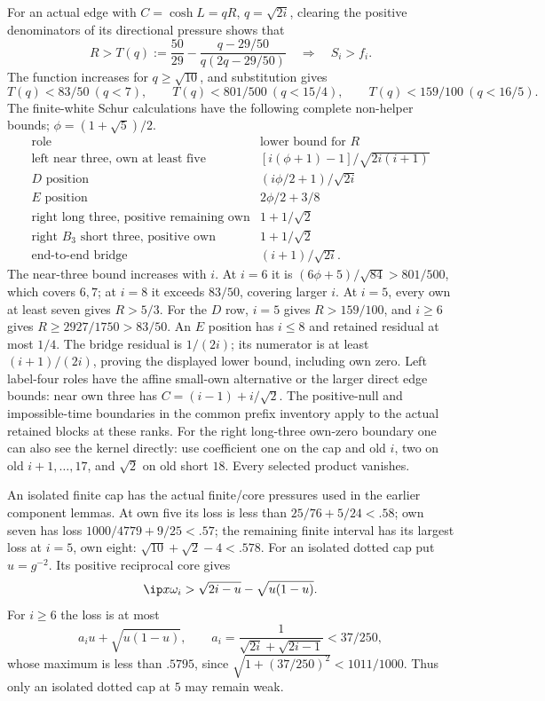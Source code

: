For an actual edge with \(C=\cosh L=qR\), \(q=\sqrt{2i}\),
clearing the positive denominators of its directional pressure
shows that
\[
 R>T(q):=\frac{50}{29}
    -\frac{q-29/50}{q(2q-29/50)}
 \quad\Longrightarrow\quad S_i>f_i.
\]
The function increases for \(q\geq\sqrt{10}\), and substitution gives
\[
 T(q)<83/50\ (q<7),\qquad
 T(q)<801/500\ (q<15/4),\qquad
 T(q)<159/100\ (q<16/5).
\]
The finite-white Schur calculations have the following complete
non-helper bounds; \(\phi=(1+\sqrt5)/2\).
\[
\begin{array}{c|l}
\text{role}&\text{lower bound for }R\\ \hline
\text{left near three, own at least five}
 &[i(\phi+1)-1]/\sqrt{2i(i+1)}\\
D\text{ position}&(i\phi/2+1)/\sqrt{2i}\\
E\text{ position}&2\phi/2+3/8\\
\text{right long three, positive remaining own}
 &1+1/\sqrt2\\
\text{right }B_3\text{ short three, positive own}
 &1+1/\sqrt2\\
\text{end-to-end bridge}&(i+1)/\sqrt{2i}.
\end{array}
\]
The near-three bound increases with \(i\). At \(i=6\) it is
\((6\phi+5)/\sqrt{84}>801/500\), which covers \(6,7\);
at \(i=8\) it exceeds \(83/50\), covering larger \(i\).
At \(i=5\), every own at least seven gives \(R>5/3\).
For the \(D\) row, \(i=5\) gives \(R>159/100\), and
\(i\geq6\) gives \(R\geq2927/1750>83/50\).
An \(E\) position has \(i\leq8\) and retained residual at most
\(1/4\). The bridge residual is \(1/(2i)\); its numerator is
at least \((i+1)/(2i)\), proving the displayed lower bound,
including own zero. Left label-four roles have the affine
small-own alternative or the larger direct edge bounds:
near own three has \(C=(i-1)+i/\sqrt2\).
The positive-null and impossible-time boundaries in the common
prefix inventory apply to the actual retained blocks at these
ranks. For the right long-three own-zero boundary one can also
see the kernel directly: use coefficient one on the cap and
old \(i\), two on old \(i+1,\ldots,17\), and \(\sqrt2\) on
old short \(18\). Every selected product vanishes.

An isolated finite cap has the actual finite/core pressures used
in the earlier component lemmas. At own five its loss is less than
\(25/76+5/24<.58\); own seven has loss
\(1000/4779+9/25<.57\); the remaining finite interval has its
largest loss at \(i=5\), own eight:
\(\sqrt{10}+\sqrt2-4<.578\).
For an isolated dotted cap put \(u=g^{-2}\). Its positive
reciprocal core gives
\[
 \ip x{\omega_i}>\sqrt{2i-u}-\sqrt{u(1-u)}.
\]
For \(i\geq6\) the loss is at most
\[
 a_i u+\sqrt{u(1-u)},\qquad
 a_i=\frac1{\sqrt{2i}+\sqrt{2i-1}}<37/250,
\]
whose maximum is less than \(.5795\), since
\(\sqrt{1+(37/250)^2}<1011/1000\).
Thus only an isolated dotted cap at \(5\) may remain weak.

